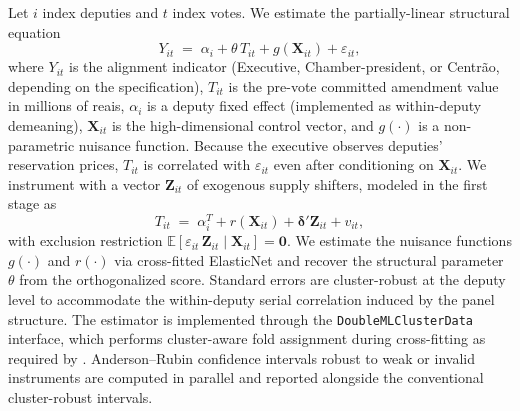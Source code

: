 \documentclass[pdflatex,sn-basic]{sn-jnl}
\begin{document}
Let $i$ index deputies and $t$ index votes. We estimate the partially-linear structural equation
\begin{equation}
Y_{it} \;=\; \alpha_i + \theta\, T_{it} + g(\mathbf{X}_{it}) + \varepsilon_{it},
\label{eq:y}
\end{equation}
where $Y_{it}$ is the alignment indicator (Executive, Chamber-president, or Centr\~ao, depending on the specification), $T_{it}$ is the pre-vote committed amendment value in millions of reais, $\alpha_i$ is a deputy fixed effect (implemented as within-deputy demeaning), $\mathbf{X}_{it}$ is the high-dimensional control vector, and $g(\cdot)$ is a non-parametric nuisance function. Because the executive observes deputies' reservation prices, $T_{it}$ is correlated with $\varepsilon_{it}$ even after conditioning on $\mathbf{X}_{it}$. We instrument with a vector $\mathbf{Z}_{it}$ of exogenous supply shifters, modeled in the first stage as
\begin{equation}
T_{it} \;=\; \alpha_i^{T} + r(\mathbf{X}_{it}) + \boldsymbol\delta'\mathbf{Z}_{it} + v_{it},
\label{eq:t}
\end{equation}
with exclusion restriction $\mathbb{E}[\varepsilon_{it}\,\mathbf{Z}_{it} \mid \mathbf{X}_{it}] = \mathbf{0}$. We estimate the nuisance functions $g(\cdot)$ and $r(\cdot)$ via cross-fitted ElasticNet \citep{Chernozhukov2018} and recover the structural parameter $\theta$ from the orthogonalized score. Standard errors are cluster-robust at the deputy level to accommodate the within-deputy serial correlation induced by the panel structure. The estimator is implemented through the \texttt{DoubleMLClusterData} interface, which performs cluster-aware fold assignment during cross-fitting as required by \citet{ChiangKatoMaSasaki2022}. Anderson--Rubin confidence intervals \citep{AndersonRubin1949} robust to weak or invalid instruments are computed in parallel and reported alongside the conventional cluster-robust intervals.
\end{document}
